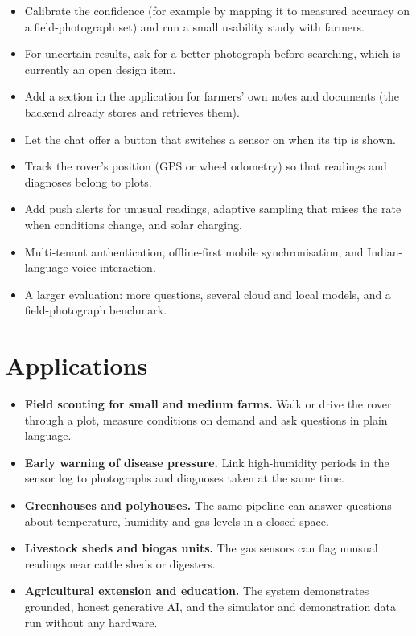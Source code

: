 \begin{itemize}
\item Calibrate the confidence (for example by mapping it to measured accuracy on a field-photograph set) and run a small usability study with farmers.
\item For uncertain results, ask for a better photograph before searching, which is currently an open design item.
\item Add a section in the application for farmers' own notes and documents (the backend already stores and retrieves them).
\item Let the chat offer a button that switches a sensor on when its tip is shown.
\item Track the rover's position (GPS or wheel odometry) so that readings and diagnoses belong to plots.
\item Add push alerts for unusual readings, adaptive sampling that raises the rate when conditions change, and solar charging.
\item Multi-tenant authentication, offline-first mobile synchronisation, and Indian-language voice interaction.
\item A larger evaluation: more questions, several cloud and local models, and a field-photograph benchmark.
\end{itemize}

\section{Applications}

\begin{itemize}
\item \textbf{Field scouting for small and medium farms.} Walk or drive the rover through a plot, measure conditions on demand and ask questions in plain language.
\item \textbf{Early warning of disease pressure.} Link high-humidity periods in the sensor log to photographs and diagnoses taken at the same time.
\item \textbf{Greenhouses and polyhouses.} The same pipeline can answer questions about temperature, humidity and gas levels in a closed space.
\item \textbf{Livestock sheds and biogas units.} The gas sensors can flag unusual readings near cattle sheds or digesters.
\item \textbf{Agricultural extension and education.} The system demonstrates grounded, honest generative AI, and the simulator and demonstration data run without any hardware.
\end{itemize}
